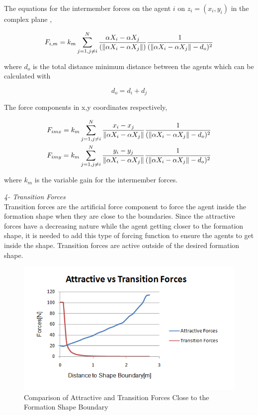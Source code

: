 The equations for the intermember forces on the agent $i$ on $z_i = (x_i, y_i)$  in the complex plane ,
			
\begin{equation}
F_{i,m} = k_m \sum_{j=1, j\neq i}^{N}\frac{\alpha X_i - \alpha X_j}{(\left\lVert\alpha X_i - \alpha X_j\right\rVert)} \frac{1}{(\left\lVert\alpha X_i - \alpha X_j\right\rVert - d_o)^2}
\end{equation}
			
where $d_o$ is the total distance minimum distance between the agents which can be calculated with

\begin{equation}
 d_o = d_i + d_j
\end{equation}
			
The force components in x,y coordinates respectively,

\begin{align*}
&F_{imx} = k_m \sum_{j=1, j\neq i}^{N}\frac{x_i- x_j}{\left\lVert\alpha X_i - \alpha X_j\right\rVert}  \frac{1}{(\left\lVert\alpha X_i - \alpha X_j\right\rVert - d_o)^2}\\
&F_{imy} = k_m \sum_{j=1, j\neq i}^{N}\frac{y_i- y_j}{\left\lVert\alpha X_i - \alpha X_j\right\rVert}  \frac{1}{(\left\lVert\alpha X_i - \alpha X_j\right\rVert - d_o)^2}\\
\end{align*}
		
where $k_m$ is the variable gain for the intermember forces.  \newline
			
\textit{4- Transition Forces} \\ 		
Transition forces are the artificial force component to force the agent inside the formation shape when they are close to the boundaries. Since the attractive forces have a decreasing nature while the agent getting closer to the formation shape, it is needed to add this type of forcing function to ensure the agents to get inside the shape. Transition forces are active outside of the desired formation shape.
			
\begin{figure}[H]
\caption{Comparison of Attractive and Transition Forces Close to the Formation Shape Boundary}
\centering
\includegraphics[scale = 0.80]{transition_forces}
\end{figure}		

